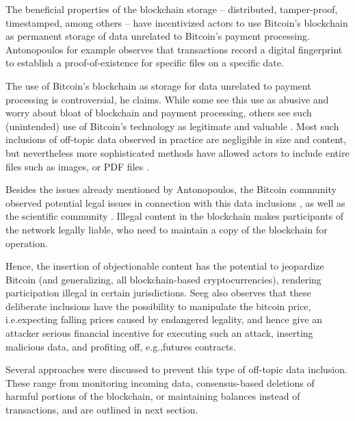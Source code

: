 \documentclass[a4paper,11pt,titlepage]{scrbook}
\begin{document}
The beneficial properties of the blockchain storage – distributed, tamper-proof, timestamped, among others – have incentivized actors to use Bitcoin's blockchain as permanent storage of data unrelated to Bitcoin's payment processing.
Antonopoulos for example observes that transactions record a digital fingerprint to establish a proof-of-existence for specific files on a specific date.

The use of Bitcoin's blockchain as storage for data unrelated to payment processing is controversial, he claims.
While some see this use as abusive and worry about bloat of blockchain and payment processing, others see such (unintended) use of Bitcoin's technology as legitimate and valuable \cite[155]{antonopoulos_mastering_2017}.
Most such inclusions of off-topic data observed in practice are negligible in size and content, but nevertheless more sophisticated methods have allowed actors to include entire files such as images, or PDF files \cite{matzutt_quantitative_2018}.

Besides the issues already mentioned by Antonopoulos, the Bitcoin community observed potential legal issues in connection with this data inclusions \cite{bitcoinwiki_weaknesses_2011}, as well as the scientific community \cite{mcreynolds_cryptographic_2015}.
Illegal content in the blockchain makes participants of the network legally liable, who need to maintain a copy of the blockchain for operation.

Hence, the insertion of objectionable content has the potential to jeopardize Bitcoin (and generalizing, all blockchain-based cryptocurrencies), rendering participation illegal in certain jurisdictions.
Seeg \cite[1--2]{seeg_hardening_2018} also observes that these deliberate inclusions have the possibility to manipulate the bitcoin price, i.e.\@ expecting falling prices caused by endangered legality, and hence give an attacker serious financial incentive for executing such an attack, inserting malicious data, and profiting off, e.g.,\@ futures contracts.

Several approaches were discussed to prevent this type of off-topic data inclusion.
These range from monitoring incoming data, consensus-based deletions of harmful portions of the blockchain, or maintaining balances instead of transactions, and are outlined in next section.
\end{document}
